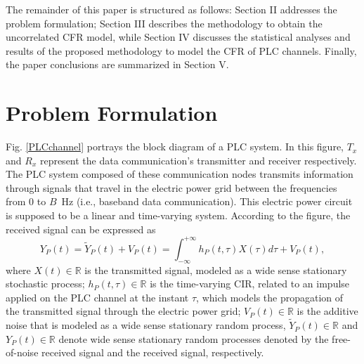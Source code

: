 \documentclass[journal]{IEEEtran}
\begin{document}
The remainder of this paper is structured as follows: Section II addresses
the problem formulation; Section III describes the methodology to obtain the uncorrelated \ac{CFR} model, while Section IV discusses the statistical analyses and results of the proposed methodology to model the \ac{CFR} of \ac{PLC} channels. Finally, the paper conclusions are summarized in Section V.


\section{Problem Formulation}

Fig. \ref{PLCchannel} portrays the block diagram of a \ac{PLC} system. In this figure, $T_x$ and $R_x$ represent the data communication's transmitter and receiver respectively. The \ac{PLC} system composed of these communication nodes transmits information through signals that travel in the electric power grid between the frequencies from $0$ to $B$~Hz (i.e., baseband data communication). This electric power circuit is supposed to be a linear and time-varying system. According to the figure, the received signal can be expressed as
\begin{equation} \label{received signal}
Y_P(t) = \tilde{Y}_P(t)+V_P(t) = \int_{-\infty}^{+\infty} h_P(t,\tau) X(\tau) d\tau + V_P(t),
\end{equation}
where $X(t)\in \mathbb{R}$ is the transmitted signal, modeled as a wide sense stationary stochastic process; $h_P(t,\tau)\in \mathbb{R}$ is the time-varying \ac{CIR}, related to an impulse applied on the \ac{PLC} channel at the instant $\tau$, which models the propagation of the transmitted signal through the electric power grid; $V_P(t)\in \mathbb{R}$ is the additive noise that is modeled as a wide sense stationary random process, $\tilde{Y}_P(t)\in \mathbb{R}$ and $Y_P(t)\in \mathbb{R}$ denote wide sense stationary random processes denoted by the free-of-noise received signal and the received signal, respectively.
\end{document}
